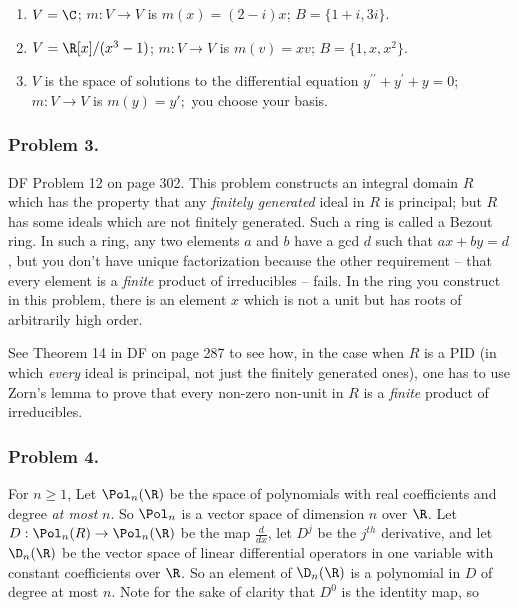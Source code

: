 \documentclass[]{article}
\begin{document}
\begin{enumerate}
\def\labelenumi{\arabic{enumi}.}
\item
  \(V=\C\); \(m:V\to V\) is \(m(x)=(2-i)x\);
  \(B=\lbrace 1+i,3i\rbrace\).
\item
  \(V=\R[x]/(x^3-1)\); \(m:V\to V\) is \(m(v)=xv\);
  \(B=\lbrace 1,x,x^2\rbrace\).
\item
  \(V\) is the space of solutions to the differential equation
  \(y^{\prime\prime} +y^{\prime}+y=0\); \(m:V\to V\) is \(m(y)=y';\) you
  choose your basis.
\end{enumerate}

\hypertarget{problem-3.}{%
\subsubsection{Problem 3.}\label{problem-3.}}

DF Problem 12 on page 302. This problem constructs an integral domain
\(R\) which has the property that any \emph{finitely generated} ideal in
\(R\) is principal; but \(R\) has some ideals which are not finitely
generated. Such a ring is called a Bezout ring. In such a ring, any two
elements \(a\) and \(b\) have a gcd \(d\) such that \(ax+by=d\), but you
don't have unique factorization because the other requirement -- that
every element is a \emph{finite} product of irreducibles -- fails. In
the ring you construct in this problem, there is an element \(x\) which
is not a unit but has roots of arbitrarily high order.

See Theorem 14 in DF on page 287 to see how, in the case when \(R\) is a
PID (in which \emph{every} ideal is principal, not just the finitely
generated ones), one has to use Zorn's lemma to prove that every
non-zero non-unit in \(R\) is a \emph{finite} product of irreducibles.

\hypertarget{problem-4.}{%
\subsubsection{Problem 4.}\label{problem-4.}}

For \(n\ge 1\), Let \(\Pol_{n}(\R)\) be the space of polynomials with
real coefficients and degree \emph{at most} \(n\). So \(\Pol_{n}\) is a
vector space of dimension \(n\) over \(\R\). Let
\(D:\Pol_{n}(R)\to\Pol_{n}(\R)\) be the map \(\frac{d}{dx}\), let
\(D^{j}\) be the \(j^{th}\) derivative, and let \(\D_{n}(\R)\) be the
vector space of linear differential operators in one variable with
constant coefficients over \(\R\). So an element of \(\D_{n}(\R)\) is a
polynomial in \(D\) of degree at most \(n\). Note for the sake of
clarity that \(D^{0}\) is the identity map, so
\end{document}
